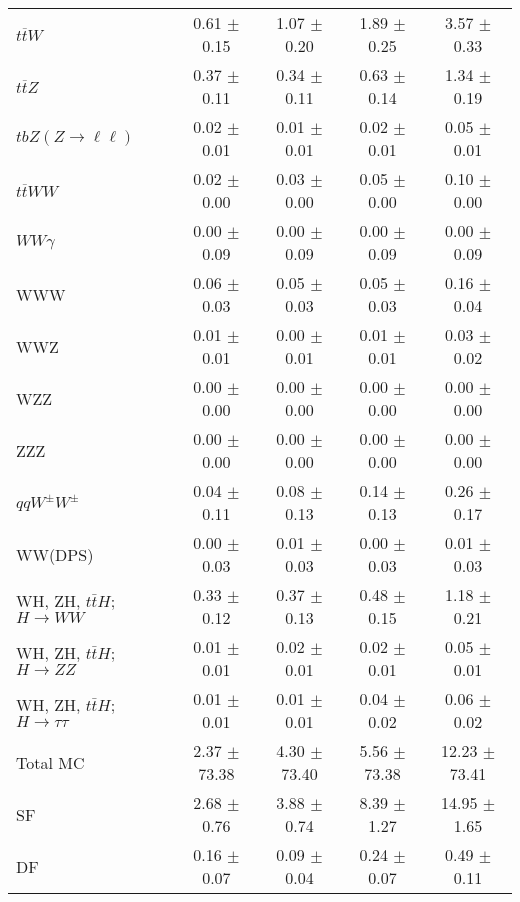 \begin{tabular}{l|cccc}
                   $t\overline{t}W$ &  0.61 $\pm$  0.15 &  1.07 $\pm$  0.20 &  1.89 $\pm$  0.25 &  3.57 $\pm$  0.33 \\
                   $t\overline{t}Z$ &  0.37 $\pm$  0.11 &  0.34 $\pm$  0.11 &  0.63 $\pm$  0.14 &  1.34 $\pm$  0.19 \\
    $tbZ (Z \rightarrow \ell \ell)$ &  0.02 $\pm$  0.01 &  0.01 $\pm$  0.01 &  0.02 $\pm$  0.01 &  0.05 $\pm$  0.01 \\
                  $t\overline{t}WW$ &  0.02 $\pm$  0.00 &  0.03 $\pm$  0.00 &  0.05 $\pm$  0.00 &  0.10 $\pm$  0.00 \\
                         $WW\gamma$ &  0.00 $\pm$  0.09 &  0.00 $\pm$  0.09 &  0.00 $\pm$  0.09 &  0.00 $\pm$  0.09 \\
                                WWW &  0.06 $\pm$  0.03 &  0.05 $\pm$  0.03 &  0.05 $\pm$  0.03 &  0.16 $\pm$  0.04 \\
                                WWZ &  0.01 $\pm$  0.01 &  0.00 $\pm$  0.01 &  0.01 $\pm$  0.01 &  0.03 $\pm$  0.02 \\
                                WZZ &  0.00 $\pm$  0.00 &  0.00 $\pm$  0.00 &  0.00 $\pm$  0.00 &  0.00 $\pm$  0.00 \\
                                ZZZ &  0.00 $\pm$  0.00 &  0.00 $\pm$  0.00 &  0.00 $\pm$  0.00 &  0.00 $\pm$  0.00 \\
                 $qqW^{\pm}W^{\pm}$ &  0.04 $\pm$  0.11 &  0.08 $\pm$  0.13 &  0.14 $\pm$  0.13 &  0.26 $\pm$  0.17 \\
                            WW(DPS) &  0.00 $\pm$  0.03 &  0.01 $\pm$  0.03 &  0.00 $\pm$  0.03 &  0.01 $\pm$  0.03 \\
WH, ZH, $t\bar{t}H$; $H \rightarrow WW$ &  0.33 $\pm$  0.12 &  0.37 $\pm$  0.13 &  0.48 $\pm$  0.15 &  1.18 $\pm$  0.21 \\
WH, ZH, $t\bar{t}H$; $H \rightarrow ZZ$ &  0.01 $\pm$  0.01 &  0.02 $\pm$  0.01 &  0.02 $\pm$  0.01 &  0.05 $\pm$  0.01 \\
WH, ZH, $t\bar{t}H$; $H \rightarrow \tau\tau$ &  0.01 $\pm$  0.01 &  0.01 $\pm$  0.01 &  0.04 $\pm$  0.02 &  0.06 $\pm$  0.02 \\
\hline\hline
                           Total MC &  2.37 $\pm$ 73.38 &  4.30 $\pm$ 73.40 &  5.56 $\pm$ 73.38 & 12.23 $\pm$ 73.41 \\
\hline
                                 SF &  2.68 $\pm$  0.76 &  3.88 $\pm$  0.74 &  8.39 $\pm$  1.27 & 14.95 $\pm$  1.65 \\
                                 DF &  0.16 $\pm$  0.07 &  0.09 $\pm$  0.04 &  0.24 $\pm$  0.07 &  0.49 $\pm$  0.11 \\

\end{tabular}
